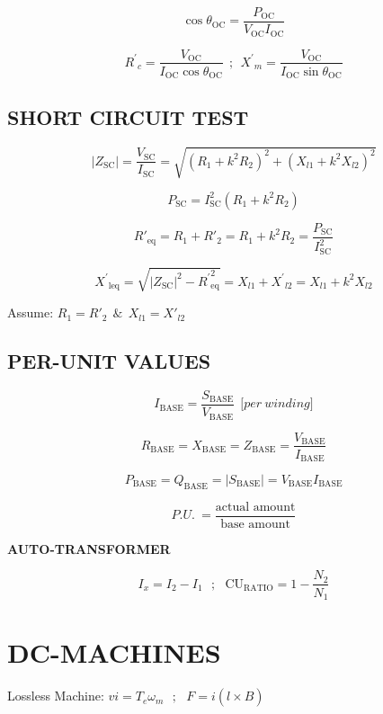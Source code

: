 \begin{multicols}{2}
	\[\cos\theta_{\text{OC}} = \frac{P_{\text{OC}}}{V_{\text{OC}}I_{\text{OC}}}\]
	
	\[{R^{'}}_{c} = \frac{V_{\text{OC}}}{I_{\text{OC}}\cos\theta_{\text{OC}}}\ \ ;\ \ {X^{'}}_{m} = \frac{V_{\text{OC}}}{I_{\text{OC}}\sin\theta_{\text{OC}}}\]
	
	\subsection{SHORT CIRCUIT TEST}
	
	\[\left| Z_{\text{SC}} \right| = \frac{V_{\text{SC}}}{I_{\text{SC}}} = \sqrt{\left( R_{1} + k^{2}R_{2} \right)^{2} + \left( X_{l1} + k^{2}X_{l2} \right)^{2}}\]
	
	\[P_{\text{SC}} = I_{\text{SC}}^{2}(R_{1} + k^{2}R_{2})\]
	
	\[{R'}_{\text{eq}} = R_{1} + {R'}_{2} = R_{1} + k^{2}R_{2} = \frac{P_{\text{SC}}}{I_{\text{SC}}^{2}}\]
	
	\[{X^{'}}_{\text{leq}} = \sqrt{\left| Z_{\text{SC}} \right|^{2} - {R^{'}}_{\text{eq}}^{2}} = X_{l1} + {X^{'}}_{l2} = X_{l1} + k^{2}X_{l2}\]
	
	Assume: \(R_{1} = {R'}_{2}\ \ \&\ \ X_{l1} = {X'}_{l2}\)
	
	\subsection{PER-UNIT VALUES}
	
	\[I_{\text{BASE}} = \frac{S_{\text{BASE}}}{V_{\text{BASE}}}\ \ \lbrack per\ winding\rbrack\]
	
	\[R_{\text{BASE}} = X_{\text{BASE}} = Z_{\text{BASE}} = \frac{V_{\text{BASE}}}{I_{\text{BASE}}}\]
	
	\[P_{\text{BASE}} = Q_{\text{BASE}} = \left| S_{\text{BASE}} \right| = V_{\text{BASE}}I_{\text{BASE}}\]
	
	\[P.U.\  = \frac{\text{actual\ amount}}{\text{base\ amount}}\]
	
	\textbf{AUTO-TRANSFORMER}
	
	\[I_{x} = I_{2} - I_{1}\ \ \ ;\ \ \ \text{CU}_{\text{RATIO}} = 1 - \frac{N_{2}}{N_{1}}\]
	
	\section{DC-MACHINES}
	
	Lossless Machine:
	\(vi = T_{e}\omega_{m}\ \ \ ;\ \ \ \overset{}{F} = i(\overset{}{l} \times \overset{}{B})\)
	

\end{multicols}
